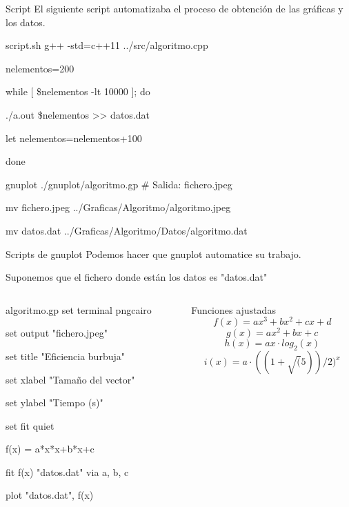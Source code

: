 \documentclass[compress]{beamer}
\begin{document}
\begin{frame}
	\begin{block}{Script}
		El siguiente script automatizaba el proceso de obtención de las gráficas y los 				datos.		
	\end{block}
	
	\begin{exampleblock}{script.sh}
		g++ -std=c++11 ../src/algoritmo.cpp
		
		nelementos=200
				
		while [ 	\$nelementos -lt 10000 ]; do
		
    		\hspace{0.75cm}	./a.out \$nelementos >> datos.dat
    			
    		\hspace{0.75cm}	let nelementos=nelementos+100
    			
		done
		

		gnuplot ./gnuplot/algoritmo.gp \# Salida: fichero.jpeg
		
		mv fichero.jpeg ../Graficas/Algoritmo/algoritmo.jpeg
		
		mv datos.dat ../Graficas/Algoritmo/Datos/algoritmo.dat
	\end{exampleblock}
	
\end{frame}

\begin{frame}
	\begin{block}{Scripts de gnuplot}
		Podemos hacer que gnuplot automatice su trabajo.
		
		Suponemos que el fichero donde están los datos es "datos.dat"
	\end{block}
	\pause
	
	\begin{columns}
	\begin{column}{5cm}
	\begin{exampleblock}{algoritmo.gp}
	set terminal pngcairo
	
	set output "fichero.jpeg"
	
	set title "Eficiencia burbuja"
	
	set xlabel "Tamaño del vector"

	set ylabel "Tiempo (s)"

	set fit quiet

	f(x) = a*x*x+b*x+c

	fit f(x) "datos.dat" via a, b, c

	plot "datos.dat", f(x)
	\end{exampleblock}
	\end{column}
	\pause
	
	\begin{column}{5cm}
	\begin{block}{Funciones ajustadas}
		\[f(x)=ax^3 + bx^2 + cx + d\]
		\[g(x)=ax^2 + bx + c\]
		\[h(x)=ax\cdot log_2(x)\]
		\[i(x)=a \cdot ((1+ \sqrt(5))/2)^x\]
	\end{block}
	\end{column}
	
	\end{columns}
\end{frame}
\end{document}
